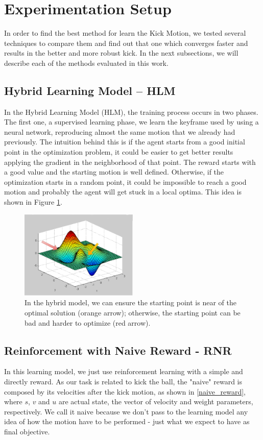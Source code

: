 \section{Experimentation Setup}
In order to find the best method for learn the Kick Motion, we tested several techniques to compare them and find out that one which converges faster and results in the better and more robust kick. In the next subsections, we will describe each of the methods evaluated in this work.

\subsection{Hybrid Learning Model -- HLM}
In the Hybrid Learning Model (HLM), the training process occurs in two phases. The first one, a supervised learning phase, we learn the keyframe used by using a neural network, reproducing almost the same motion that we already had previously. The intuition behind this is if the agent starts from a good initial point in the optimization problem, it could be easier to get better results applying the gradient in the neighborhood of that point. The reward starts with a good value and the starting motion is well defined. Otherwise, if the optimization starts in a random point, it could be impossible to reach a good motion and probably the agent will get stuck in a local optima. This idea is shown in Figure \ref{optimization_intuition}.

\begin{figure}[!htbp]
	\centering
	\includegraphics[width=0.5\textwidth]{Cap5/optimization_final.eps}
	\caption{In the hybrid model, we can ensure the starting point is near of the optimal solution (orange arrow); otherwise, the starting point can be bad and harder to optimize (red arrow).}
	\label{optimization_intuition}
\end{figure}

\subsection{Reinforcement with Naive Reward - RNR }
In this learning model, we just use reinforcement learning with a simple and directly reward. As our task is related to kick the ball, the "naive" reward is composed by its velocities after the kick motion, as shown in \ref{naive_reward}, where $s$, $v$ and $u$ are actual state, the vector of velocity and weight parameters, respectively. We call it naive because we don't pass to the learning model any idea of how the motion have to be performed - just what we expect to have as final objective. 

